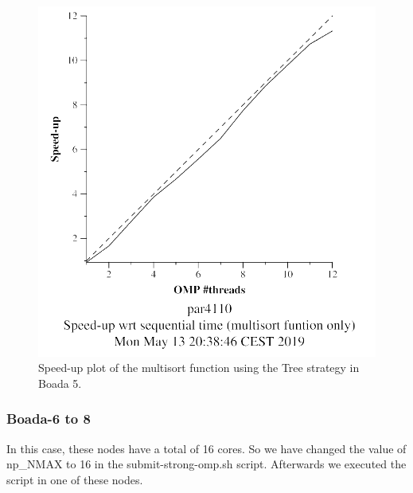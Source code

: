 \documentclass[12pt, a4paper]{article}
\begin{document}
\begin{figure}[H]
\begin{minipage}[b]{0.4\linewidth}
  \includegraphics[scale=0.5]{./S2/multisort-omp-strong_boada-5_tree_multisort_only}
  \caption{Speed-up plot of the multisort function using the Tree strategy in Boada 5.}
  \label{fig:mandel-omp-10000-strong-21-speedup}
\end{minipage}
\end{figure}

\subsubsection{Boada-6 to 8}

In this case, these nodes have a total of 16 cores. So we have changed the value of np_NMAX to 16 in the submit-strong-omp.sh script. Afterwards we executed the script in one of these nodes.
\end{document}
